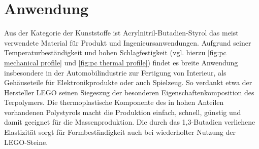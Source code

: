     \section{Anwendung}\label{sec:anwendung}
            Aus der Kategorie der Kunststoffe ist Acrylnitril-Butadien-Styrol das meist verwendete Material für Produkt und
            Ingenieursanwendungen.
            Aufgrund seiner Temperaturbeständigkeit und hohen Schlagfestigkeit (vgl. hierzu \cref{fig:pc mechanical profile} und \cref{fig:pc thermal profile}) findet es breite Anwendung insbesondere in der
            Automobilindustrie zur Fertigung von Interieur, als Gehäuseteile für Elektronikprodukte oder auch Spielzeug. So verdankt etwa der Hersteller
            \textsc{LEGO} seinen Siegeszug der besonderen Eigenschaftenkomposition des Terpolymers. Die thermoplastische Komponente
            des in hohen Anteilen vorhandenen Polystyrols macht die Produktion einfach, schnell, günstig und damit geeignet
            für die Massenproduktion. Die durch das 1,3-Butadien verliehene Elastizität sorgt für Formbeständigkeit auch bei
            wiederholter Nutzung der \textsc{LEGO}-Steine.

